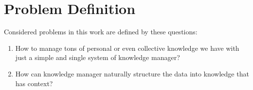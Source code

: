 \section{Problem Definition}
\label{sec:problem-definition}

Considered problems in this work are defined by these questions:

\begin{enumerate}
\item How to manage tons of personal or even collective knowledge we have with just a simple and single system of knowledge manager?
\item How can knowledge manager naturally structure the data into knowledge that has context?
\end{enumerate}


